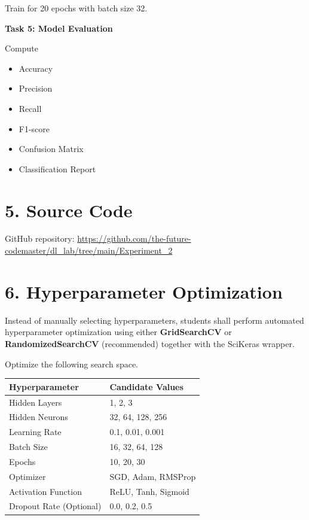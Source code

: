 \documentclass[11pt]{article}
\begin{document}
Train for 20 epochs with batch size 32.

\bigskip

\textbf{Task 5: Model Evaluation}

Compute

\begin{itemize}
\item Accuracy
\item Precision
\item Recall
\item F1-score
\item Confusion Matrix
\item Classification Report
\end{itemize}


\section*{5. Source Code}
GitHub repository:
\url{https://github.com/the-future-codemaster/dl_lab/tree/main/Experiment_2}


\section*{6. Hyperparameter Optimization}

Instead of manually selecting hyperparameters, students shall perform automated hyperparameter optimization using either \textbf{GridSearchCV} or \textbf{RandomizedSearchCV} (recommended) together with the SciKeras wrapper.

Optimize the following search space.

\begin{center}
\begin{tabular}{|p{5cm}|p{7cm}|}
\hline
Hyperparameter & Candidate Values\\
\hline
Hidden Layers & 1, 2, 3\\
Hidden Neurons & 32, 64, 128, 256\\
Learning Rate & 0.1, 0.01, 0.001\\
Batch Size & 16, 32, 64, 128\\
Epochs & 10, 20, 30\\
Optimizer & SGD, Adam, RMSProp\\
Activation Function & ReLU, Tanh, Sigmoid\\
Dropout Rate (Optional) & 0.0, 0.2, 0.5\\
\hline
\end{tabular}
\end{center}
\end{document}
